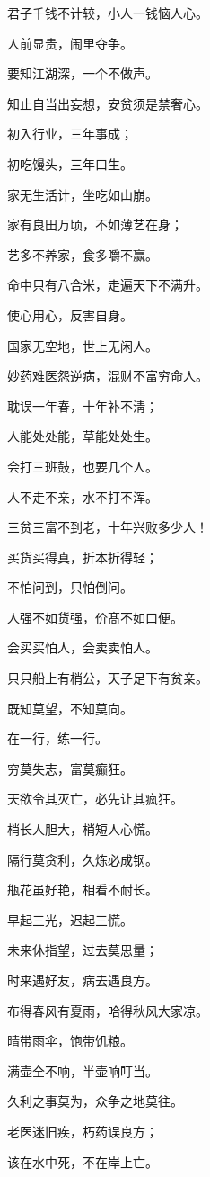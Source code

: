 \documentclass[12pt,oneside]{book}
\begin{document}
君子千钱不计较，小人一钱恼人心。

人前显贵，闹里夺争。

要知江湖深，一个不做声。

知止自当出妄想，安贫须是禁奢心。

初入行业，三年事成；

初吃馒头，三年口生。

家无生活计，坐吃如山崩。

家有良田万顷，不如薄艺在身；

艺多不养家，食多嚼不赢。

命中只有八合米，走遍天下不满升。

使心用心，反害自身。

国家无空地，世上无闲人。

妙药难医怨逆病，混财不富穷命人。

耽误一年春，十年补不淸；

人能处处能，草能处处生。

会打三班鼓，也要几个人。

人不走不亲，水不打不浑。

三贫三富不到老，十年兴败多少人！

买货买得真，折本折得轻；

不怕问到，只怕倒问。

人强不如货强，价髙不如口便。

会买买怕人，会卖卖怕人。

只只船上有梢公，天子足下有贫亲。

既知莫望，不知莫向。

在一行，练一行。

穷莫失志，富莫癫狂。

天欲令其灭亡，必先让其疯狂。

梢长人胆大，梢短人心慌。

隔行莫贪利，久炼必成钢。

甁花虽好艳，相看不耐长。

早起三光，迟起三慌。

未来休指望，过去莫思量；

时来遇好友，病去遇良方。

布得春风有夏雨，哈得秋风大家凉。

晴带雨伞，饱带饥粮。

满壶全不响，半壶响叮当。

久利之事莫为，众争之地莫往。

老医迷旧疾，朽药误良方；

该在水中死，不在岸上亡。
\end{document}
